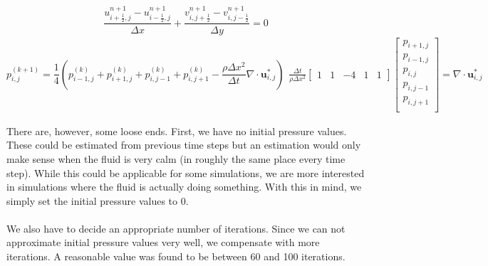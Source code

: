 \documentclass[twocolumn]{article}
\begin{document}
\begin{equation}
  \frac{u_{i+\frac{1}{2}, j}^{n+1} - u_{i-\frac{1}{2}, j}^{n+1}}{\Delta x} + \frac{v_{i, j+\frac{1}{2}}^{n+1} - v_{i, j-\frac{1}{2}}^{n+1}}{\Delta y} = 0
\label{eqn:discrete-incompressibility}
\end{equation}
\begin{subequations}
\begin{equation}
  p^{(k+1)}_{i, j} = \frac{1}{4}
    (p^{(k)}_{i-1, j} + p^{(k)}_{i+1, j} + p^{(k)}_{i, j-1} + p^{(k)}_{i, j+1} - \frac{\rho \Delta x^2}{\Delta t} \nabla \cdot \mathbf{u}^*_{i, j})
\label{eqn:jacobi-iteration}
\end{equation}
\begin{equation}
\begin{split}
  \frac{\Delta t}{\rho \Delta x^2}
    \begin{bmatrix}
        1 & 1 & -4 & 1 & 1
    \end{bmatrix}
    \begin{bmatrix}
      p_{i+1, j}\\
      p_{i-1, j}\\
      p_{i, j}\\
      p_{i, j-1}\\
      p_{i, j+1}\\
    \end{bmatrix} =
    \nabla \cdot \mathbf{u}^*_{i, j}
\end{split}
\label{eqn:jacobi-iteration-matrix}
\end{equation}
\label{eqn:pressure}
\end{subequations}

There are, however, some loose ends. First, we have no initial pressure values. These could be estimated from previous time steps but an estimation would only make sense when the fluid is very calm (in roughly the same place every time step). While this could be applicable for some simulations, we are more interested in simulations where the fluid is actually doing something. With this in mind, we simply set the initial pressure values to $0$.
\\\\
We also have to decide an appropriate number of iterations. Since we can not approximate initial pressure values very well, we compensate with more iterations. A reasonable value was found to be between 60 and 100 iterations.
\end{document}
